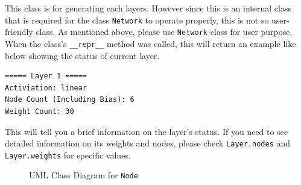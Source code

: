 \documentclass{homework}
\newenvironment{code}{\captionsetup{type=listing}}{}
\begin{document}
This class is for generating each layers. However since this is an internal class that is required for the class \texttt{Network} to operate properly, this is not so user-friendly class. As mentioned above, please use \texttt{Network} class for user purpose. When the class's \texttt{__repr__} method was called, this will return an example like below showing the status of current layer.
\\
\begin{center}
\begin{code}
\begin{verbatim}
===== Layer 1 =====
Activiation: linear
Node Count (Including Bias): 6
Weight Count: 30
\end{verbatim}
\end{code}
\end{center}
This will tell you a brief information on the layer's status. If you need to see detailed information on its weights and nodes, please check \texttt{Layer.nodes} and \texttt{Layer.weights} for specific values.

\pagebreak

\begin{figure}[h]
\centering
    \caption{UML Class Diagram for \texttt{Node}}
\end{figure}
\end{document}
